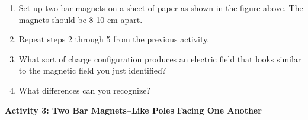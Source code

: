 \vspace{0.3cm}
{\centering {} \par}
\vspace{0.3cm}

\begin{enumerate}
\item Set up two bar magnets on a sheet of paper as shown in the figure
above. The magnets should be 8-10 cm apart.
\item Repeat steps 2 through 5 from the previous activity.
\item What sort of charge configuration produces an electric field that
looks similar to the magnetic field you just identified?\vspace{30mm}

\item What differences can you recognize?\vspace{30mm}

\end{enumerate}

\newpage

\textbf{Activity 3: Two Bar Magnets--Like Poles Facing One Another}

\vspace{0.3cm}
{\centering {} \par}
\vspace{0.3cm}

